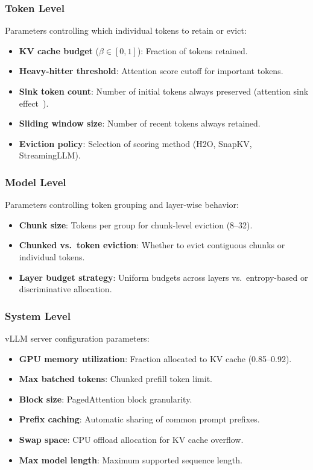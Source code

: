 \documentclass[conference]{IEEEtran}
\begin{document}
\subsubsection{Token Level}
Parameters controlling which individual tokens to retain or evict:
\begin{itemize}
\item \textbf{KV cache budget} ($\beta \in [0,1]$): Fraction of tokens retained.
\item \textbf{Heavy-hitter threshold}: Attention score cutoff for important tokens.
\item \textbf{Sink token count}: Number of initial tokens always preserved (attention sink effect~\cite{streamingllm}).
\item \textbf{Sliding window size}: Number of recent tokens always retained.
\item \textbf{Eviction policy}: Selection of scoring method (H2O, SnapKV, StreamingLLM).
\end{itemize}

\subsubsection{Model Level}
Parameters controlling token grouping and layer-wise behavior:
\begin{itemize}
\item \textbf{Chunk size}: Tokens per group for chunk-level eviction (8--32).
\item \textbf{Chunked vs.\ token eviction}: Whether to evict contiguous chunks or individual tokens.
\item \textbf{Layer budget strategy}: Uniform budgets across layers vs.\ entropy-based or discriminative allocation.
\end{itemize}

\subsubsection{System Level}
vLLM server configuration parameters:
\begin{itemize}
\item \textbf{GPU memory utilization}: Fraction allocated to KV cache (0.85--0.92).
\item \textbf{Max batched tokens}: Chunked prefill token limit.
\item \textbf{Block size}: PagedAttention block granularity.
\item \textbf{Prefix caching}: Automatic sharing of common prompt prefixes.
\item \textbf{Swap space}: CPU offload allocation for KV cache overflow.
\item \textbf{Max model length}: Maximum supported sequence length.
\end{itemize}
\end{document}
